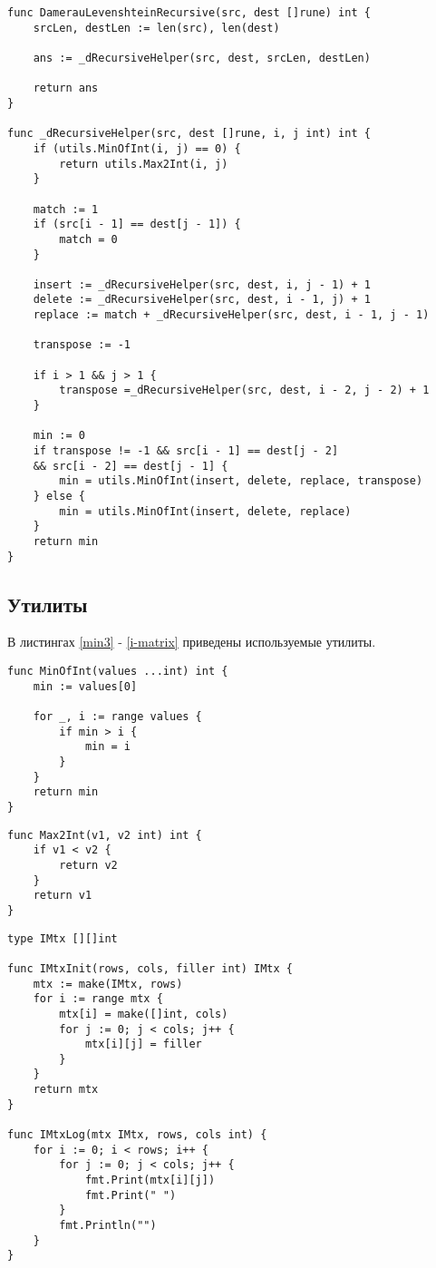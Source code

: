 \begin{lstlisting}[label=damer-lev-rec,caption=Программный код нахождения расстояния Дамерау -- Левенштейна рекурсивно]	
func DamerauLevenshteinRecursive(src, dest []rune) int {
	srcLen, destLen := len(src), len(dest)
	
	ans := _dRecursiveHelper(src, dest, srcLen, destLen)
	
	return ans
}

func _dRecursiveHelper(src, dest []rune, i, j int) int {
	if (utils.MinOfInt(i, j) == 0) {
		return utils.Max2Int(i, j)
	}
	
	match := 1
	if (src[i - 1] == dest[j - 1]) {
		match = 0
	}
	
	insert := _dRecursiveHelper(src, dest, i, j - 1) + 1
	delete := _dRecursiveHelper(src, dest, i - 1, j) + 1
	replace := match + _dRecursiveHelper(src, dest, i - 1, j - 1)
	
	transpose := -1
	
	if i > 1 && j > 1 {
		transpose =_dRecursiveHelper(src, dest, i - 2, j - 2) + 1
	}
	
	min := 0
	if transpose != -1 && src[i - 1] == dest[j - 2] 
	&& src[i - 2] == dest[j - 1] {
		min = utils.MinOfInt(insert, delete, replace, transpose)
	} else {
		min = utils.MinOfInt(insert, delete, replace)
	}
	return min
}
\end{lstlisting}

\subsection{Утилиты}
В листингах \ref{min3} - \ref{i-matrix} приведены используемые утилиты.
\begin{lstlisting}[label=min3,caption=Функция нахождения минимума из N целых чисел]
func MinOfInt(values ...int) int {
	min := values[0]
	
	for _, i := range values {
		if min > i {
			min = i
		}
	}
	return min
}
\end{lstlisting}

\begin{lstlisting}[label=max2,caption=Функция нахождения максимума из двух целых чисел]
func Max2Int(v1, v2 int) int {
	if v1 < v2 {
		return v2
	}
	return v1
}
\end{lstlisting}


\begin{lstlisting}[label=i-matrix,caption=Определение типа целочисленной матрицы; его инициализация и вывод]
type IMtx [][]int

func IMtxInit(rows, cols, filler int) IMtx {
	mtx := make(IMtx, rows)
	for i := range mtx {
		mtx[i] = make([]int, cols)
		for j := 0; j < cols; j++ {
			mtx[i][j] = filler
		}
	}
	return mtx
}

func IMtxLog(mtx IMtx, rows, cols int) {
	for i := 0; i < rows; i++ {
		for j := 0; j < cols; j++ {
			fmt.Print(mtx[i][j])
			fmt.Print(" ")
		}
		fmt.Println("")
	}
}
\end{lstlisting}

